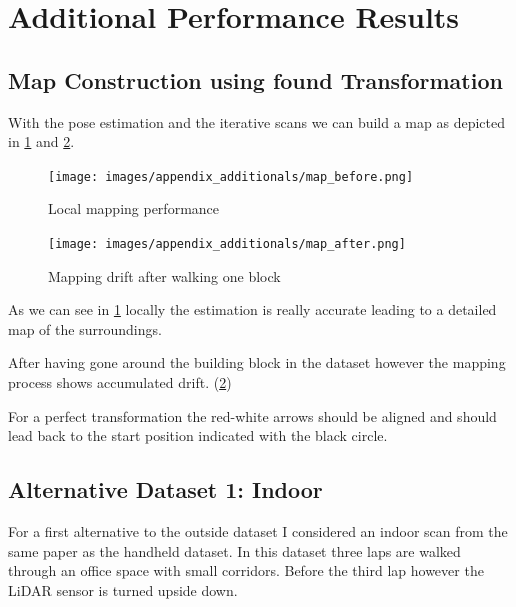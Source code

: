 {\section{Additional Performance Results}\label{sec:additional_results}{
    \subsection{Map Construction using found Transformation}{
        With the pose estimation and the iterative scans we can build a map as depicted in \cref{fig:local_mapping} and \cref{fig:global_mapping}.
        \begin{figure}[ht]
            \centering
            \texttt{[image: images/appendix\_additionals/map\_before.png]}
            \caption{Local mapping performance}
            \label{fig:local_mapping}
        \end{figure}
        
        \begin{figure}[ht]
            \centering
            \texttt{[image: images/appendix\_additionals/map\_after.png]}
            \caption{Mapping drift after walking one block}
            \label{fig:global_mapping}
        \end{figure}

        As we can see in \cref{fig:local_mapping} locally the estimation is really accurate leading to a detailed map of the surroundings.

        After having gone around the building block in the dataset however the mapping process shows accumulated drift. (\cref{fig:global_mapping})

        For a perfect transformation the red-white arrows should be aligned and should lead back to the start position indicated with the black circle.

    }
    \clearpage

    \subsection{Alternative Dataset 1: Indoor}{
        For a first alternative to the outside dataset I considered an indoor scan from the same paper\citep{robust2021shan} as the handheld dataset. In this dataset three laps are walked through an office space with small corridors. Before the third lap however the LiDAR sensor is turned upside down.

}}}
